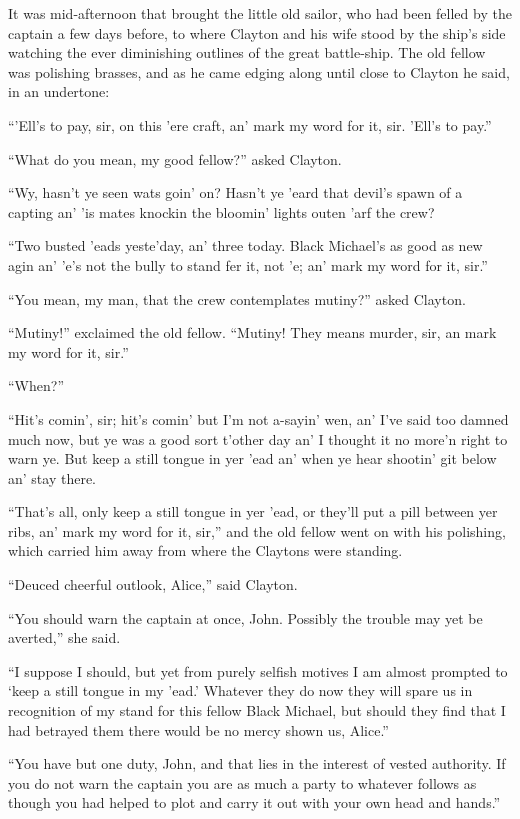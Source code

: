 It was mid-afternoon that brought the little old sailor, who had been felled by the captain a few days before, to where Clayton and his wife stood by the ship’s side watching the ever diminishing outlines of the great battle-ship. The old fellow was polishing brasses, and as he came edging along until close to Clayton he said, in an undertone:

“\kern1pt’Ell’s to pay, sir, on this ’ere craft, an’ mark my word for it, sir. ’Ell’s to pay.”

“What do you mean, my good fellow?” asked Clayton.

“Wy, hasn’t ye seen wats goin’ on? Hasn’t ye ’eard that devil’s spawn of a capting an’ ’is mates knockin the bloomin’ lights outen ’arf the crew?

“Two busted ’eads yeste’day, an’ three today. Black Michael’s as good as new agin an’ ’e’s not the bully to stand fer it, not ’e; an’ mark my word for it, sir.”

“You mean, my man, that the crew contemplates mutiny?” asked Clayton.

“Mutiny!” exclaimed the old fellow. “Mutiny! They means murder, sir, an mark my word for it, sir.”

“When?”

“Hit’s comin’, sir; hit’s comin’ but I’m not a-sayin’ wen, an’ I’ve said too damned much now, but ye was a good sort t’other day an’ I thought it no more’n right to warn ye. But keep a still tongue in yer ’ead an’ when ye hear shootin’ git below an’ stay there.

“That’s all, only keep a still tongue in yer ’ead, or they’ll put a pill between yer ribs, an’ mark my word for it, sir,” and the old fellow went on with his polishing, which carried him away from where the Claytons were standing.

“Deuced cheerful outlook, Alice,” said Clayton.

“You should warn the captain at once, John. Possibly the trouble may yet be averted,” she said.

“I suppose I should, but yet from purely selfish motives I am almost prompted to ‘keep a still tongue in my ’ead.’ Whatever they do now they will spare us in recognition of my stand for this fellow Black Michael, but should they find that I had betrayed them there would be no mercy shown us, Alice.”

“You have but one duty, John, and that lies in the interest of vested authority. If you do not warn the captain you are as much a party to whatever follows as though you had helped to plot and carry it out with your own head and hands.”

